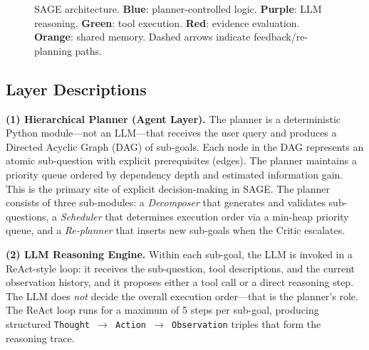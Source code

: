 \documentclass[11pt]{article}
\begin{document}
\begin{figure}[h!]
\caption{SAGE architecture. \textbf{Blue}: planner-controlled logic. \textbf{Purple}:
LLM reasoning. \textbf{Green}: tool execution. \textbf{Red}: evidence evaluation.
\textbf{Orange}: shared memory. Dashed arrows indicate feedback/re-planning paths.}
\label{fig:arch}
\end{figure}

\subsection{Layer Descriptions}

\textbf{(1) Hierarchical Planner (Agent Layer).}
The planner is a deterministic Python module---not an LLM---that receives the user query
and produces a Directed Acyclic Graph (DAG) of sub-goals. Each node in the DAG
represents an atomic sub-question with explicit prerequisites (edges). The planner
maintains a priority queue ordered by dependency depth and estimated information gain.
This is the primary site of explicit decision-making in SAGE. The planner consists of three sub-modules: a \emph{Decomposer} that generates and validates sub-questions, a \emph{Scheduler} that determines execution order via a min-heap priority queue, and a \emph{Re-planner} that inserts new sub-goals when the Critic escalates.

\textbf{(2) LLM Reasoning Engine.}
Within each sub-goal, the LLM is invoked in a ReAct-style loop: it receives the
sub-question, tool descriptions, and the current observation history, and it proposes
either a tool call or a direct reasoning step. The LLM does \emph{not} decide the
overall execution order---that is the planner's role. The ReAct loop runs for a maximum of 5 steps per sub-goal, producing structured \texttt{Thought $\to$ Action $\to$ Observation} triples that form the reasoning trace.
\end{document}
